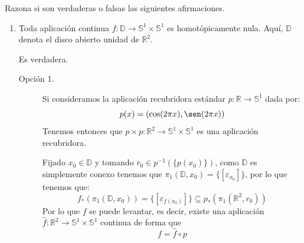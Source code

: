 \documentclass[12pt]{article}
\begin{document}
    \begin{ejercicio}
        Razona si son verdaderas o falsas las siguientes afirmaciones.
        \begin{enumerate}[label=\alph*)]
            \item Toda aplicación continua $f:\mathbb{D}\to \mathbb{S}^1\times\mathbb{S}^1$ es homotópicamente nula. Aquí, $\mathbb{D}$ denota el disco abierto unidad de $\mathbb{R}^2$.

                Es verdadera.
                \begin{description}
                    \item[Opción 1.] Si consideramos la aplicación recubridora estándar $p:\mathbb{R}\to \mathbb{S}^1$ dada por:
                    \begin{equation*}
                        p(x) = (\cos(2\pi x),\sen(2\pi x))
                    \end{equation*}
                    Tenemos entonces que $p\times p:\mathbb{R}^2\to \mathbb{S}^1\times\mathbb{S}^1$ es una aplicación recubridora.
                    \begin{figure}[H]
                        \centering
                    \end{figure}
                    \noindent
                    Fijado $x_0\in \mathbb{D}$ y tomando $r_0\in p^{-1}(\{p(x_0)\})$, como $\mathbb{D}$ es simplemente conexo tenemos que $\pi_1(\mathbb{D},x_0) = \{[\varepsilon_{x_0}]\}$, por lo que tenemos que:
                    \begin{equation*}
                        f_\ast(\pi_1(\mathbb{D},x_0)) = \{[\varepsilon_{f(x_0)}]\} \subseteq p_\ast(\pi_1(\mathbb{R}^2,r_0))
                    \end{equation*}
                    Por lo que $f$ se puede levantar, es decir, existe una aplicación $\hat{f}:\mathbb{R}^2\to \mathbb{S}^1\times\mathbb{S}^1$ continua de forma que
                    \begin{equation*}
                        f = \hat{f} \circ p
                    \end{equation*}

\end{description}
\end{enumerate}
\end{ejercicio}
\end{document}
